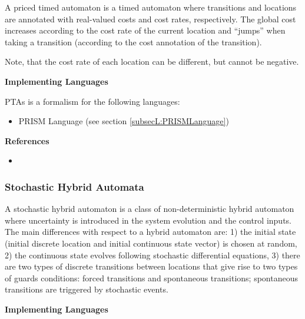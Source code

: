 
A priced timed automaton is a timed automaton where transitions and locations are annotated with real-valued costs and cost rates, respectively. The global cost increases according to the cost rate of the current location and ``jumps'' when taking a transition (according to the cost annotation of the transition).

Note, that the cost rate of each location can be different, but cannot be negative.

\textbf{Implementing Languages}

PTAs is a formalism for the following languages:
\begin{itemize}
	\item PRISM Language (see section \ref{subsecL:PRISMLanguage})
\end{itemize}





\textbf{References}
\begin{itemize}
	
\item {}
\end{itemize}



\subsubsection{Stochastic Hybrid Automata}
\label{subsecF:HybridAutomataStochastic}


A stochastic hybrid automaton is a class of non-deterministic hybrid automaton where uncertainty is introduced  in the system evolution and the control inputs. The main differences with respect to a hybrid automaton are: 1) the initial state (initial discrete location and initial continuous state vector) is chosen at random, 2) the continuous state evolves following stochastic differential equations, 3) there are two types of discrete transitions between locations that give rise to two types of guards conditions: forced transitions and spontaneous transitions; spontaneous transitions are triggered by stochastic events.

\textbf{Implementing Languages}

